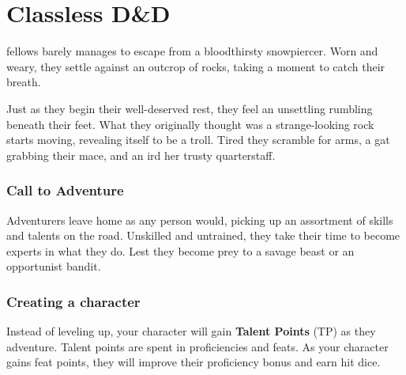 \chapter{Classless D\&D} \label{ch::classlessdnd}
fellows barely manages to escape from a bloodthirsty snowpiercer.
Worn and weary, they settle against an outcrop of rocks, taking a moment to catch their breath.

Just as they begin their well-deserved rest, they feel an unsettling rumbling beneath their feet.
What they originally thought was a strange-looking rock starts moving, revealing itself to be a troll.
Tired they scramble for arms, a gat grabbing their mace, and an ird her trusty quarterstaff.

\subsection*{Call to Adventure}
Adventurers leave home as any person would, picking up an assortment of skills and talents on the road.
Unskilled and untrained, they take their time to become experts in what they do.
Lest they become prey to a savage beast or an opportunist bandit.

\subsection*{Creating a character}
Instead of leveling up, your character will gain \textbf{Talent Points} (TP) as they adventure.
Talent points are spent in proficiencies and feats.
As your character gains feat points, they will improve their proficiency bonus and earn hit dice.

